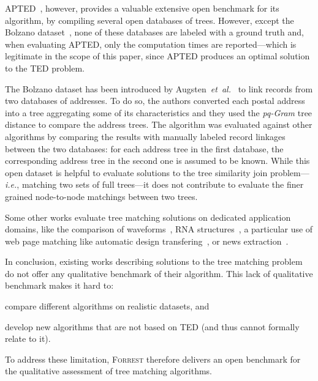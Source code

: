 \documentclass{vldb}
\newcommand{\forrest}[0]{\textsc{Forrest}\xspace}
\begin{document}
APTED~\cite{pawlik2015efficient, pawlik2016tree}, however, provides a valuable extensive open benchmark for its algorithm, by compiling several open databases of trees.
However, except the Bolzano dataset~\cite{augsten2008pq}, none of these databases are labeled with a ground truth and, when evaluating APTED, only the computation times are reported---which is legitimate in the scope of this paper, since APTED produces an optimal solution to the TED problem.

The Bolzano dataset has been introduced by Augsten~\emph{et~al.}~\cite{augsten2008pq} to link records from two databases of addresses.
To do so, the authors converted each postal address into a tree aggregating some of its characteristics and they used the \emph{pq-Gram} tree distance to compare the address trees.
The algorithm was evaluated against other algorithms by comparing the results with manually labeled record linkages between the two databases: for each address tree in the first database, the corresponding address tree in the second one is assumed to be known.
While this open dataset is helpful to evaluate solutions to the tree similarity join problem---\emph{i.e.}, matching two sets of full trees---it does not contribute to evaluate the finer grained node-to-node matchings between two trees.

Some other works evaluate tree matching solutions on dedicated application domains, like the comparison of waveforms~\cite{Cheng1985WaveformMatching}, RNA structures~\cite{Shapiro1990ComparingComparisons}, a particular use of web page matching like automatic design transfering~\cite{Kumar2011_Bricolage}, or news extraction~\cite{reis2004automatic}.

In conclusion, existing works describing solutions to the tree matching problem do not offer any qualitative benchmark of their algorithm.
This lack of qualitative benchmark makes it hard to:
\begin{inparaenum}
    \item compare different algorithms on realistic datasets, and
    \item develop new algorithms that are not based on TED (and thus cannot formally relate to it).
\end{inparaenum}
To address these limitation, \forrest therefore delivers an open benchmark for the qualitative assessment of tree matching algorithms.
\end{document}
